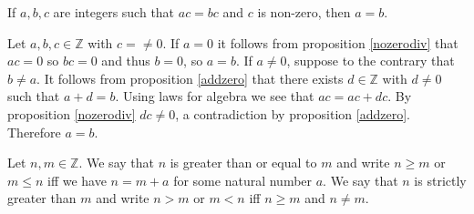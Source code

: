\documentclass{article}
\begin{document}
\begin{corollary}
	If \(a,b,c\) are integers such that \(ac=bc\) and \(c\) is non-zero, then \(a=b\).
\end{corollary}
\begin{IEEEproof}
	Let \(a,b,c\in\mathbb{Z}\) with \(c=\neq 0\). If \(a=0\) it follows from proposition \ref{nozerodiv} that \(ac=0\) so \(bc=0\) and thus \(b=0\), so \(a=b\). If \(a\neq 0\), suppose to the contrary that \(b\neq a\). It follows from proposition \ref{addzero} that there exists \(d\in\mathbb{Z}\) with \(d\neq 0\) such that \(a+d=b\). Using laws for algebra we see that \(ac=ac+dc\). By proposition \ref{nozerodiv} \(dc\neq 0\), a contradiction by proposition \ref{addzero}. Therefore \(a=b\).
\end{IEEEproof}
\begin{definition}
	Let \(n,m\in\mathbb{Z}\). We say that \(n\) is greater than or equal to \(m\) and write \(n\geq m\) or \(m\leq n\) iff we have \(n=m+a\) for some natural number \(a\). We say that \(n\) is strictly greater than \(m\) and write \(n>m\) or \(m<n\) iff \(n\geq m\) and \(n\neq m\).
\end{definition}
\end{document}
